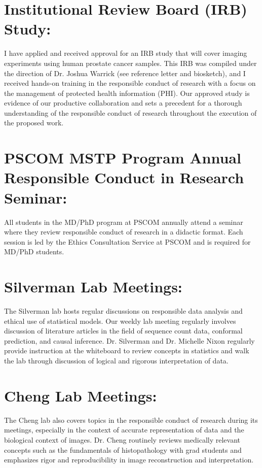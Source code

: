 \documentclass{NIHGrant}
\begin{document}
\section*{Institutional Review Board (IRB) Study:}
I have applied and received approval for an IRB study that will cover imaging experiments using human prostate cancer samples. This IRB was compiled under the direction of Dr. Joshua Warrick (see reference letter and biosketch), and I received hands-on training in the responsible conduct of research with a focus on the management of protected health information (PHI). Our approved study is evidence of our productive collaboration and sets a precedent for a thorough understanding of the responsible conduct of research throughout the execution of the proposed work.

\section*{PSCOM MSTP Program Annual Responsible Conduct in Research Seminar:}
All students in the MD/PhD program at PSCOM annually attend a seminar where they review responsible conduct of research in a didactic format. Each session is led by the Ethics Consultation Service at PSCOM and is required for MD/PhD students.

\section*{Silverman Lab Meetings:}
The Silverman lab hosts regular discussions on responsible data analysis and ethical use of statistical models. Our weekly lab meeting regularly involves discussion of literature articles in the field of sequence count data, conformal prediction, and causal inference. Dr. Silverman and Dr. Michelle Nixon regularly provide instruction at the whiteboard to review concepts in statistics and walk the lab through discussion of logical and rigorous interpretation of data.

\section*{Cheng Lab Meetings:}
The Cheng lab also covers topics in the responsible conduct of research during its meetings, especially in the context of accurate representation of data and the biological context of images. Dr. Cheng routinely reviews medically relevant concepts such as the fundamentals of histopathology with grad students and emphasizes rigor and reproducibility in image reconstruction and interpretation.

\end{document}
